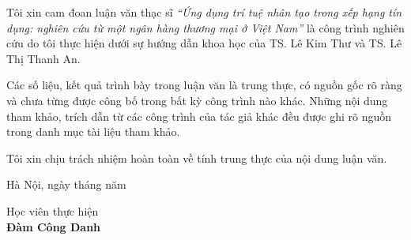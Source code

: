 Tôi xin cam đoan luận văn thạc sĩ \textit{``Ứng dụng trí tuệ nhân tạo trong xếp hạng tín dụng: nghiên cứu từ một ngân hàng thương mại ở Việt Nam''} là công trình nghiên cứu do tôi thực hiện dưới sự hướng dẫn khoa học của TS. Lê Kim Thư và TS. Lê Thị Thanh An.
\par
Các số liệu, kết quả trình bày trong luận văn là trung thực, có nguồn gốc rõ ràng và chưa từng được công bố trong bất kỳ công trình nào khác. Những nội dung tham khảo, trích dẫn từ các công trình của tác giả khác đều được ghi rõ nguồn trong danh mục tài liệu tham khảo.
\par
Tôi xin chịu trách nhiệm hoàn toàn về tính trung thực của nội dung luận văn.
\begin{flushright}
    Hà Nội, ngày tháng năm 
    \textbf{}\\[0.1 cm]
\end{flushright}
\begin{center}
   \hspace{8.8cm}  Học viên thực hiện\\[2 cm]

   \hspace{8.8cm} \bf Đàm Công Danh
\end{center}
